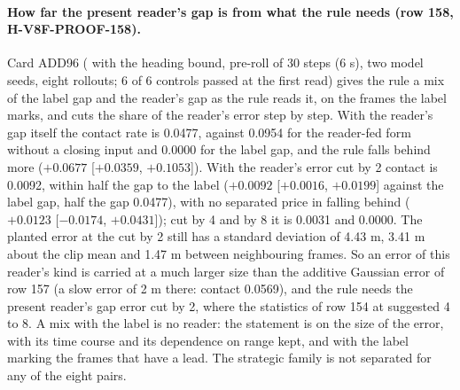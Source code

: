 \paragraph{How far the present reader's gap is from what the rule needs (row 158, H-V8F-PROOF-158).} Card ADD96 ( with the heading bound, pre-roll of 30 steps (6 s), two model seeds, eight rollouts; 6 of 6 controls passed at the first read) gives the rule a mix of the label gap and the reader's gap as the rule reads it, on the frames the label marks, and cuts the share of the reader's error step by step. With the reader's gap itself the contact rate is 0.0477, against 0.0954 for the reader-fed form without a closing input and 0.0000 for the label gap, and the rule falls behind more ($+0.0677$ [$+0.0359$, $+0.1053$]). With the reader's error cut by 2 contact is 0.0092, within half the gap to the label ($+0.0092$ [$+0.0016$, $+0.0199$] against the label gap, half the gap 0.0477), with no separated price in falling behind ($+0.0123$ [$-0.0174$, $+0.0431$]); cut by 4 and by 8 it is 0.0031 and 0.0000. The planted error at the cut by 2 still has a standard deviation of 4.43 m, 3.41 m about the clip mean and 1.47 m between neighbouring frames. So an error of this reader's kind is carried at a much larger size than the additive Gaussian error of row 157 (a slow error of 2 m there: contact 0.0569), and the rule needs the present reader's gap error cut by 2, where the statistics of row 154 at  suggested 4 to 8. A mix with the label is no reader: the statement is on the size of the error, with its time course and its dependence on range kept, and with the label marking the frames that have a lead. The strategic family is not separated for any of the eight pairs.

